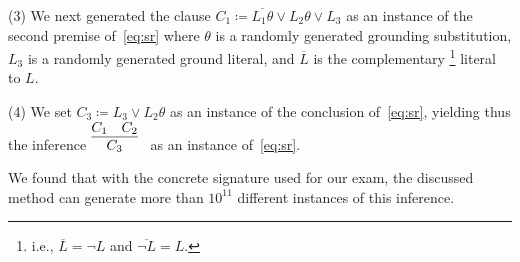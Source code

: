 
\noindent (3)  We next generated the clause
$C_1 \coloneqq \overline{L_1\theta} \lor L_2\theta \lor L_3$
as an instance of the second premise of~\eqref{eq:sr}
where $\theta$ is a randomly generated grounding substitution,
$L_3$ is a randomly generated ground literal,
and
$\overline{L}$ is the complementary%
\footnote{i.e., $\overline{L} = \lnot L$ and $\overline{\lnot L} = L$.}
literal to $L$.\smallskip

\noindent (4)
We set $C_3 \coloneqq L_3 \lor L_2\theta$ as an instance of the
conclusion of~\eqref{eq:sr}, yielding thus the inference $\infer[]{
      C_3
      }{
      C_1
      &
      {C_2}}$ as an instance of~\eqref{eq:sr}.\smallskip

 




We found that with the concrete signature used for our exam,
the discussed method can generate more than $10^{11}$ different instances
of this inference.
